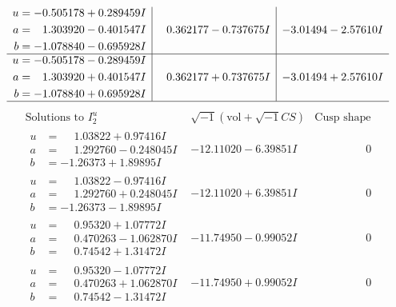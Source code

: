 \documentclass[1p]{elsarticle_modified}
\theoremstyle{definition}
\newcommand{\I}{\sqrt{-1}}
\begin{document}
$$\begin{array}{c|c|c}
\begin{aligned}
u &= -0.505178 + 0.289459 I \\
a &= \phantom{-}1.303920 - 0.401547 I \\
b &= -1.078840 - 0.695928 I\end{aligned}
 & \phantom{-}0.362177 - 0.737675 I & -3.01494 - 2.57610 I \\ \hline\begin{aligned}
u &= -0.505178 - 0.289459 I \\
a &= \phantom{-}1.303920 + 0.401547 I \\
b &= -1.078840 + 0.695928 I\end{aligned}
 & \phantom{-}0.362177 + 0.737675 I & -3.01494 + 2.57610 I\\
 \hline 
 \end{array}$$\newpage$$\begin{array}{c|c|c}  
\text{Solutions to }I^u_{2}& \I (\text{vol} + \sqrt{-1}CS) & \text{Cusp shape}\\
 \hline 
\begin{aligned}
u &= \phantom{-}1.03822 + 0.97416 I \\
a &= \phantom{-}1.292760 - 0.248045 I \\
b &= -1.26373 + 1.89895 I\end{aligned}
 & -12.11020 - 6.39851 I & \phantom{-0.000000 } 0 \\ \hline\begin{aligned}
u &= \phantom{-}1.03822 - 0.97416 I \\
a &= \phantom{-}1.292760 + 0.248045 I \\
b &= -1.26373 - 1.89895 I\end{aligned}
 & -12.11020 + 6.39851 I & \phantom{-0.000000 } 0 \\ \hline\begin{aligned}
u &= \phantom{-}0.95320 + 1.07772 I \\
a &= \phantom{-}0.470263 - 1.062870 I \\
b &= \phantom{-}0.74542 + 1.31472 I\end{aligned}
 & -11.74950 - 0.99052 I & \phantom{-0.000000 } 0 \\ \hline\begin{aligned}
u &= \phantom{-}0.95320 - 1.07772 I \\
a &= \phantom{-}0.470263 + 1.062870 I \\
b &= \phantom{-}0.74542 - 1.31472 I\end{aligned}
 & -11.74950 + 0.99052 I & \phantom{-0.000000 } 0 \\ \hline\begin{aligned}

\end{aligned}
\end{array}$$
\end{document}

